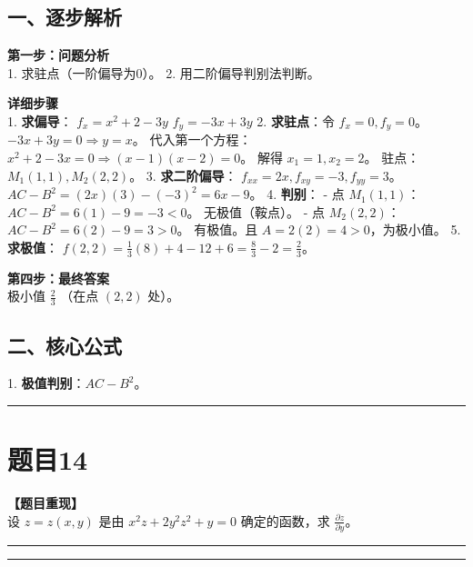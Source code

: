 \documentclass[12pt, a4paper]{ctexart}
\newcommand{\TopSeparator}{
    \par\noindent\rule{\textwidth}{1.5pt}\vspace{0.5em} %
}
\newcommand{\AnalysisSeparator}{
    \par\noindent\rule{\textwidth}{0.5pt}\vspace{0.2em}\hrule\vspace{0.5em} %
}
\newenvironment{RedAnalysis}{
    \par
    \color{red} %
}{
    \par
    \color{black} %
}
\begin{document}
\begin{RedAnalysis}

\subsection*{一、逐步解析}

\textbf{第一步：问题分析} \\
1. 求驻点（一阶偏导为0）。
2. 用二阶偏导判别法判断。

\textbf{详细步骤} \\
1. \textbf{求偏导}：
   $f_x = x^2 + 2 - 3y$
   $f_y = -3x + 3y$
2. \textbf{求驻点}：令 $f_x=0, f_y=0$。
   $-3x + 3y = 0 \Rightarrow y=x$。
   代入第一个方程：$x^2 + 2 - 3x = 0 \Rightarrow (x-1)(x-2) = 0$。
   解得 $x_1=1, x_2=2$。
   驻点：$M_1(1,1), M_2(2,2)$。
3. \textbf{求二阶偏导}：
   $f_{xx} = 2x, f_{xy} = -3, f_{yy} = 3$。
   $AC - B^2 = (2x)(3) - (-3)^2 = 6x - 9$。
4. \textbf{判别}：
   - 点 $M_1(1,1)$：$AC-B^2 = 6(1)-9 = -3 < 0$。
     无极值（鞍点）。
   - 点 $M_2(2,2)$：$AC-B^2 = 6(2)-9 = 3 > 0$。
     有极值。且 $A = 2(2) = 4 > 0$，为极小值。
5. \textbf{求极值}：
   $f(2,2) = \frac{1}{3}(8) + 4 - 12 + 6 = \frac{8}{3} - 2 = \frac{2}{3}$。

\textbf{第四步：最终答案} \\
极小值 $\frac{2}{3}$ （在点 $(2,2)$ 处）。

\subsection*{二、核心公式}
1. \textbf{极值判别}：$AC-B^2$。

\end{RedAnalysis}

\vspace{2em}

\TopSeparator
\section*{题目14}

\textbf{【题目重现】} \\
设 $ z = z(x, y) $ 是由 $ x^{2}z + 2y^{2}z^{2} + y = 0 $ 确定的函数，求 $ \frac{\partial z}{\partial y} $。

\AnalysisSeparator
\end{document}
